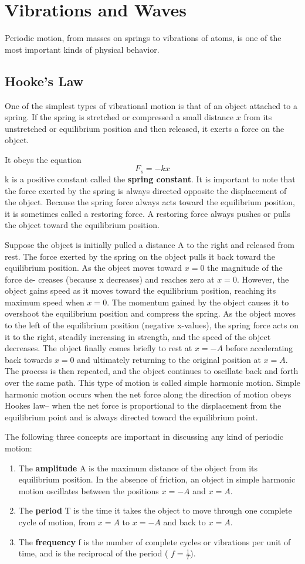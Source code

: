 \section{Vibrations and Waves}
Periodic motion, from masses on springs to vibrations of atoms, is one of the most important kinds of physical behavior.
\subsection{Hooke's Law}
One of the simplest types of vibrational motion is that of an object attached to a spring. If the spring is stretched or compressed a small distance $x$ from its unstretched or equilibrium position and then released, it exerts a force on the object.

It obeys the equation
$$F_{s}=-kx$$
k is a positive constant called the \textbf{spring constant}. It is important to note that the force exerted by the spring is always directed opposite the displacement of the object. Because the spring force always acts toward the equilibrium position, it is sometimes called a restoring force. A restoring force always pushes or pulls the object toward the equilibrium position.

Suppose the object is initially pulled a distance A to the right and released from rest. The force exerted by the spring on the object pulls it back toward the equilibrium position. As the object moves toward $x=0$ the magnitude of the force de- creases (because x decreases) and reaches zero at $x=0$. However, the object gains speed as it moves toward the equilibrium position, reaching its maximum speed when $x=0$. The momentum gained by the object causes it to overshoot the equilibrium position and compress the spring. As the object moves to the left of the equilibrium position (negative x-values), the spring force acts on it to the right, steadily increasing in strength, and the speed of the object decreases. The object finally comes briefly to rest at $x=-A$ before accelerating back towards $x=0$ and ultimately returning to the original position at $x=A$. The process is then repeated, and the object continues to oscillate back and forth over the same path. This type of motion is called simple harmonic motion. Simple harmonic motion occurs when the net force along the direction of motion obeys Hookes law-- when the net force is proportional to the displacement from the equilibrium point and is always directed toward the equilibrium point.

The following three concepts are important in discussing any kind of periodic motion:
\begin{enumerate}
\item The \textbf{amplitude} A is the maximum distance of the object from its equilibrium position. In the absence of friction, an object in simple harmonic motion oscillates between the positions $x=-A$ and $x=A$.
\item The \textbf{period} T is the time it takes the object to move through one complete cycle of motion, from $x=A$ to $x=-A$ and back to $x= A$.
\item The \textbf{frequency} f is the number of complete cycles or vibrations per unit of time, and is the reciprocal of the period ( $f=\frac{1}{T}$).
\end{enumerate}